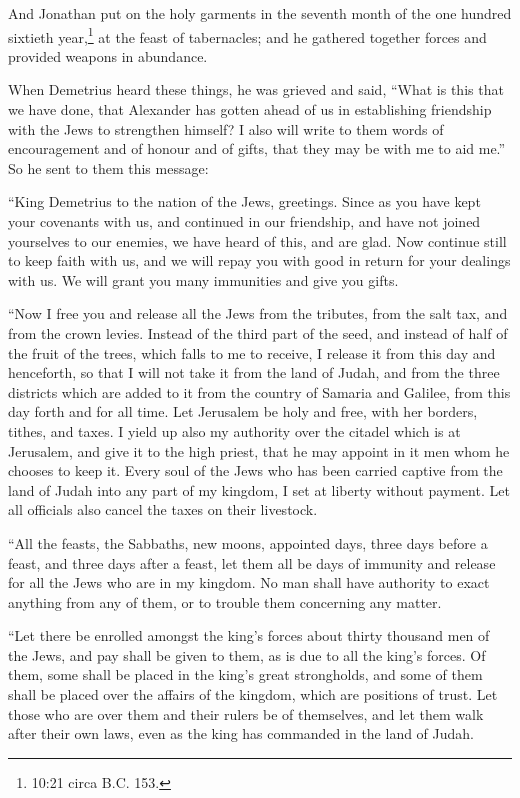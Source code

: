  And Jonathan put on the holy garments in the seventh month
of the one hundred sixtieth year,\footnote{10:21 circa B.C. 153.} at the
feast of tabernacles; and he gathered together forces and provided
weapons in abundance.

 When Demetrius heard these things, he was grieved and
said,  ``What is this that we have done, that Alexander has
gotten ahead of us in establishing friendship with the Jews to
strengthen himself?  I also will write to them words of
encouragement and of honour and of gifts, that they may be with me to
aid me.''  So he sent to them this message:

``King Demetrius to the nation of the Jews, greetings. 
Since as you have kept your covenants with us, and continued in our
friendship, and have not joined yourselves to our enemies, we have heard
of this, and are glad.  Now continue still to keep faith
with us, and we will repay you with good in return for your dealings
with us.  We will grant you many immunities and give you
gifts.

 ``Now I free you and release all the Jews from the
tributes, from the salt tax, and from the crown levies. 
Instead of the third part of the seed, and instead of half of the fruit
of the trees, which falls to me to receive, I release it from this day
and henceforth, so that I will not take it from the land of Judah, and
from the three districts which are added to it from the country of
Samaria and Galilee, from this day forth and for all time. 
Let Jerusalem be holy and free, with her borders, tithes, and taxes.
 I yield up also my authority over the citadel which is at
Jerusalem, and give it to the high priest, that he may appoint in it men
whom he chooses to keep it.  Every soul of the Jews who has
been carried captive from the land of Judah into any part of my kingdom,
I set at liberty without payment. Let all officials also cancel the
taxes on their livestock.

 ``All the feasts, the Sabbaths, new moons, appointed days,
three days before a feast, and three days after a feast, let them all be
days of immunity and release for all the Jews who are in my kingdom.
 No man shall have authority to exact anything from any of
them, or to trouble them concerning any matter.

 ``Let there be enrolled amongst the king's forces about
thirty thousand men of the Jews, and pay shall be given to them, as is
due to all the king's forces.  Of them, some shall be
placed in the king's great strongholds, and some of them shall be placed
over the affairs of the kingdom, which are positions of trust. Let those
who are over them and their rulers be of themselves, and let them walk
after their own laws, even as the king has commanded in the land of
Judah.

